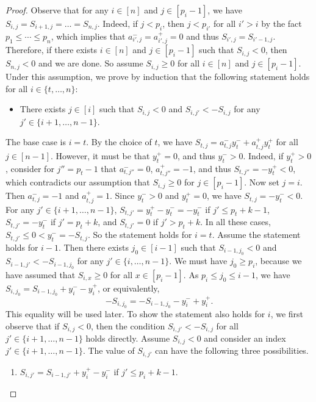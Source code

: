 \documentclass[11pt]{article}
\begin{document}
\begin{proof}
Observe that for any $i \in [n]$ and $j \in [p_i-1]$, we have $S_{i,j} = S_{i+1,j} = \dots = S_{n,j}$.
Indeed, if $j < p_i$, then $j < p_{i'}$ for all $i' > i$ by the fact $p_1 \leq \cdots \leq p_n$, which implies that $a_{i',j}^- = a_{i',j}^+ = 0$ and thus $S_{i',j} = S_{i'-1,j}$.
Therefore, if there exists $i \in [n]$ and $j \in [p_i-1]$ such that $S_{i,j} < 0$, then $S_{n,j} < 0$ and we are done.
So assume $S_{i,j} \geq 0$ for all $i \in [n]$ and $j \in [p_i-1]$.
Under this assumption, we prove by induction that the following statement holds for all $i \in \{t,\dots,n\}$:
\begin{itemize}
    \item There exists $j \in [i]$ such that $S_{i,j} < 0$ and $S_{i,j'} < - S_{i,j}$ for any $j' \in \{i+1,\dots,n-1\}$.
\end{itemize}
The base case is $i = t$.
By the choice of $t$, we have $S_{t,j} = a_{t,j}^- y_t^- + a_{t,j}^+ y_t^+$ for all $j \in [n-1]$.
However, it must be that $y_t^+ = 0$, and thus $y_t^- > 0$.
Indeed, if $y_t^+ > 0$, consider for $j'' = p_t-1$ that $a_{t,j''}^- = 0$, $a_{t,j''}^+ = -1$, and thus $S_{t,j''} = -y_t^+ < 0$, which contradicts our assumption that $S_{i,j} \geq 0$ for $j \in [p_i - 1]$.
Now set $j = i$.
Then $a_{t,j}^- = -1$ and $a_{t,j}^+ = 1$.
Since $y_t^- > 0$ and $y_t^+ = 0$, we have $S_{t,j} = -y_t^- < 0$.
For any $j' \in \{i+1,\dots,n-1\}$, $S_{t,j'} = y_t^+-y_t^- = -y_t^-$ if $j' \leq p_t+k-1$, $S_{t,j'} = -y_t^-$ if $j' = p_t+k$, and $S_{t,j'} = 0$ if $j' > p_t+k$.
In all these cases, $S_{t,j'} \leq 0 < y_t^- = -S_{t,j}$.
So the statement holds for $i = t$.
Assume the statement holds for $i-1$.
Then there exists $j_0 \in [i-1]$ such that $S_{i-1,j_0} < 0$ and $S_{i-1,j'} < - S_{i-1,j_0}$ for any $j' \in \{i,\dots,n-1\}$.
We must have $j_0 \geq p_i$, because we have assumed that $S_{i,x} \geq 0$ for all $x \in [p_i-1]$.
As $p_i \leq j_0 \leq i-1$, we have $S_{i,j_0} = S_{i-1,j_0} + y_i^- - y_i^+$, or equivalently,
\begin{equation} \label{eq-Sij0}
    -S_{i,j_0} = -S_{i-1,j_0} - y_i^- + y_i^+.
\end{equation}
This equality will be used later.
To show the statement also holds for $i$, we first observe that if $S_{i,j} < 0$, then the condition $S_{i,j'} < -S_{i,j}$ for all $j' \in \{i+1,\dots,n-1\}$ holds directly.
Assume $S_{i,j} < 0$ and consider an index $j' \in \{i+1,\dots,n-1\}$.
The value of $S_{i,j'}$ can have the following three possibilities.
\begin{enumerate}
    \item $S_{i,j'} = S_{i-1,j'} + y_i^+ - y_i^-$ if $j' \leq p_i+k-1$.

\end{enumerate}
\end{proof}
\end{document}
